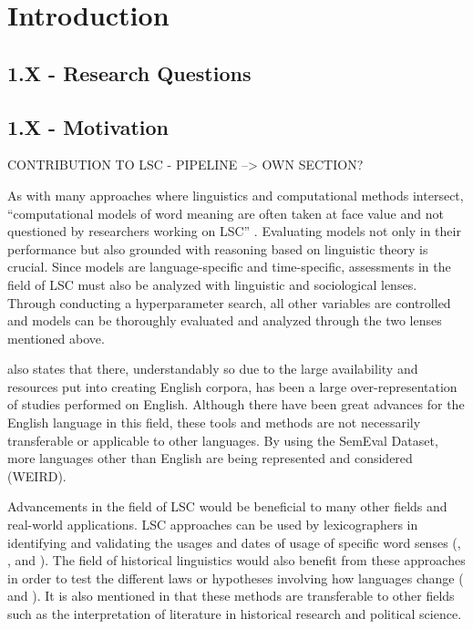 
\section{Introduction}
\label{sec:intro}

\subsection{1.X - Research Questions}

\subsection{1.X - Motivation}
CONTRIBUTION TO LSC - PIPELINE --> OWN SECTION?

As with many approaches where linguistics and computational methods intersect, “computational models of word meaning are often taken at face value and not questioned by researchers working on LSC” \citep{hengchen2021challenges}. Evaluating models not only in their performance but also grounded with reasoning based on linguistic theory is crucial. Since models are language-specific and time-specific, assessments in the field of LSC must also be analyzed with linguistic and sociological lenses. Through conducting a hyperparameter search, all other variables are controlled and models can be thoroughly evaluated and analyzed through the two lenses mentioned above. 

\citet{hengchen2021challenges} also states that there, understandably so due to the large availability and resources put into creating English corpora, has been a large over-representation of studies performed on English. Although there have been great advances for the English language in this field, these tools and methods are not necessarily transferable or applicable to other languages. By using the SemEval Dataset, more languages other than English are being represented and considered (WEIRD).  

Advancements in the field of LSC would be beneficial to many other fields and real-world applications. LSC approaches can be used by lexicographers in identifying and validating the usages and dates of usage of specific word senses (\citet{lau-etal-2012-word}, \citet{falk-etal-2014-non}, and \citet{klosa-2018-newgerman}). The field of historical linguistics would also benefit from these approaches in order to test the different laws or hypotheses involving how languages change (\citet{hamilton-etal-2016-diachronic} and \citet{Xu2015ACE}). It is also mentioned in \citet{hengchen2021challenges} that these methods are transferable to other fields such as the interpretation of literature in historical research and political science.  

